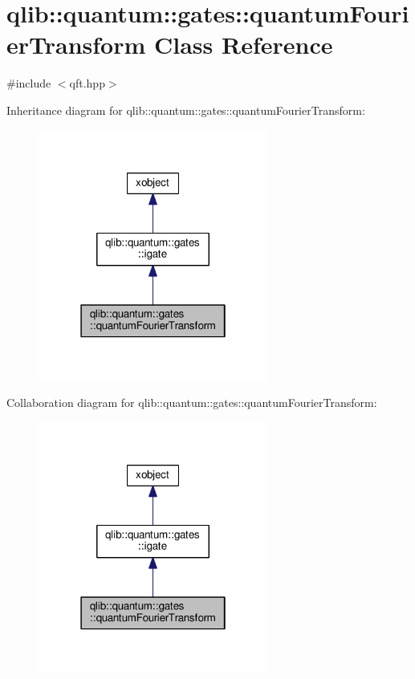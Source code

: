 \hypertarget{classqlib_1_1quantum_1_1gates_1_1quantumFourierTransform}{}\section{qlib\+:\+:quantum\+:\+:gates\+:\+:quantum\+Fourier\+Transform Class Reference}
\label{classqlib_1_1quantum_1_1gates_1_1quantumFourierTransform}


{\ttfamily \#include $<$qft.\+hpp$>$}



Inheritance diagram for qlib\+:\+:quantum\+:\+:gates\+:\+:quantum\+Fourier\+Transform\+:
\nopagebreak
\begin{figure}[H]
\begin{center}
\leavevmode
\includegraphics[width=214pt]{classqlib_1_1quantum_1_1gates_1_1quantumFourierTransform__inherit__graph}
\end{center}
\end{figure}


Collaboration diagram for qlib\+:\+:quantum\+:\+:gates\+:\+:quantum\+Fourier\+Transform\+:
\nopagebreak
\begin{figure}[H]
\begin{center}
\leavevmode
\includegraphics[width=214pt]{classqlib_1_1quantum_1_1gates_1_1quantumFourierTransform__coll__graph}
\end{center}
\end{figure}
